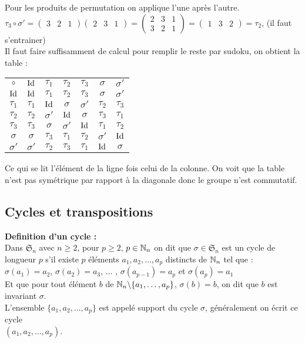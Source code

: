 Pour les produits de permutation on applique l'une après l'autre.\\ 
$\tau_3\circ\sigma'=\begin{pmatrix}
	3 & 2 & 1
\end{pmatrix}\begin{pmatrix}
2 & 3 & 1 
\end{pmatrix}=\begin{pmatrix}
2 & 3 & 1\\
3 & 2 & 1 
\end{pmatrix}=\begin{pmatrix}
1 & 3 & 2 
\end{pmatrix}=\tau_2$, (il faut s'entrainer)\\
Il faut faire suffisamment de calcul pour remplir le reste par sudoku, on obtient la table : 
\begin{center}
	\noindent\begin{tabular}{c | c c c c c c}
	$\circ$ & $\operatorname{Id}$ & $\tau_1$ & $\tau_2$ & $\tau_3$ & $\sigma$ & $\sigma'$  \\
	\cline{1-7}
	$\operatorname{Id}$ & $\operatorname{Id}$ & $\tau_1$ & $\tau_2$ & $\tau_3$ & $\sigma$ & $\sigma'$ \\
	$\tau_1$ &$\tau_1$ & $\operatorname{Id}$ & $\sigma$ & $\sigma'$ & $\tau_2$ & $\tau_3$ \\
	$\tau_2$ & $\tau_2$ & $\sigma'$ & $\operatorname{Id}$ & $\sigma$ & $\tau_3$ & $\tau_1$ \\
	$\tau_3$ & $\tau_3$ & $\sigma$ & $\sigma'$ & $\operatorname{Id}$ & $\tau_1$ & $\tau_2$ \\
	$\sigma$ & $\sigma$ & $\tau_3$ & $\tau_1$ & $\tau_2$ & $\sigma'$ & $\operatorname{Id}$ \\
	$\sigma'$ & $\sigma'$ & $\tau_2$ & $\tau_3$ & $\tau_1$ & $\operatorname{Id}$ & $\sigma$\\
\end{tabular}
\end{center}
Ce qui se lit l'élément de la ligne fois celui de la colonne. On voit que la table n'est pas symétrique par rapport à la diagonale donc le groupe n'est commutatif.\\
\subsection{Cycles et transpositions}
\textbf{Definition d'un cycle :}\\
Dans $\mathfrak{S}_n$ avec $n\geq 2$, pour $p\geq 2$, $p\in\mathbb{N}_n$ on dit que $\sigma\in\mathfrak{S}_n$ est un cycle de longueur $p$ s'il existe $p$ éléments $a_1,a_2,\dots,a_p$ distincts de $\mathbb{N}_n$ tel que :\\$\sigma(a_1)=a_2$, $\sigma(a_2)=a_3$, $\dots$ , $\sigma(a_{p-1})=a_p$ et $\sigma(a_p)=a_1$\\
Et que pour tout élément $b$ de $\mathbb{N}_n\backslash\{a_1,\dots,a_p\}$, $\sigma(b)=b$, on dit que $b$ est invariant $\sigma$.\\
L'ensemble $\{a_1,a_2,\dots,a_p\}$ est appelé support du cycle $\sigma$, généralement on écrit ce cycle\\ $(a_1,a_2,\dots,a_p)$.\\

